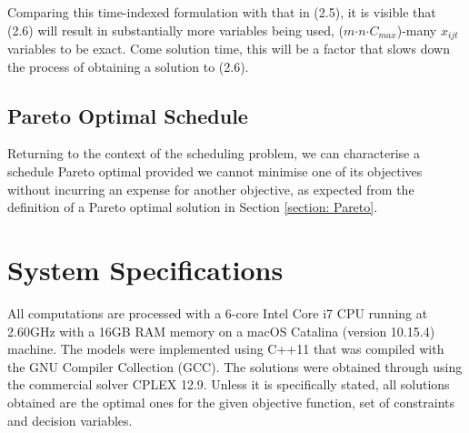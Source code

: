 \vspace{\baselineskip}
\noindent
Comparing this time-indexed formulation with that in (2.5), it is visible that (2.6) will result in substantially more variables being used, ($m$$\cdot$$n$$\cdot$$C_{max}$)-many $x_{ijt}$ variables to be exact. Come solution time, this will be a factor that slows down the process of obtaining a solution to (2.6).
\vspace{\baselineskip}


\subsection*{Pareto Optimal Schedule}
Returning to the context of the scheduling problem, we can characterise a schedule Pareto optimal provided we cannot minimise one of its objectives without
incurring an expense for another objective, as expected from the definition of a Pareto optimal solution in Section \ref{section: Pareto}.



\section{System Specifications}
All computations are processed with a 6-core Intel Core i7 CPU running at 2.60GHz with a 16GB RAM memory on a macOS Catalina (version 10.15.4) machine. The models were implemented using C++11 that was compiled with the GNU Compiler Collection (GCC). The solutions were obtained through using the commercial solver CPLEX 12.9. Unless it is specifically stated, all solutions obtained are the optimal ones for the given objective function, set of constraints and decision variables.   


\vspace{\baselineskip}

\vspace{\baselineskip}

\vspace{\baselineskip}

\vspace{\baselineskip}
